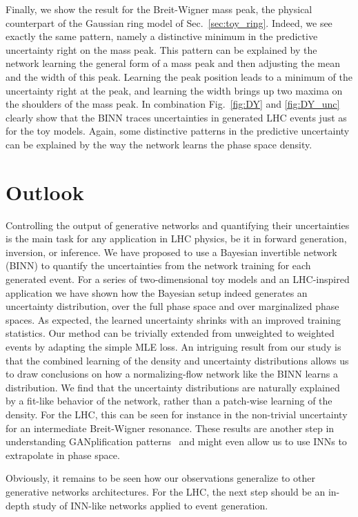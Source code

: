 Finally, we show the result for the Breit-Wigner mass peak, the
physical counterpart of the Gaussian ring model of
Sec.~\ref{sec:toy_ring}. Indeed, we see exactly the same pattern,
namely a distinctive minimum in the predictive uncertainty right on
the mass peak.  This pattern can be explained by the network learning
the general form of a mass peak and then adjusting the mean and the
width of this peak. Learning the peak position leads to a minimum of
the uncertainty right at the peak, and learning the width brings up
two maxima on the shoulders of the mass peak.  In combination
Fig.~\ref{fig:DY} and \ref{fig:DY_unc} clearly show that the BINN
traces uncertainties in generated LHC events just as for the toy
models. Again, some distinctive patterns in the predictive uncertainty
can be explained by the way the network learns the phase space
density.

\section{Outlook}

Controlling the output of generative networks and quantifying their
uncertainties is the main task for any application in LHC physics, be
it in forward generation, inversion, or inference.  We have proposed
to use a Bayesian invertible network (BINN) to quantify the
uncertainties from the network training for each generated event. For
a series of two-dimensional toy models and an LHC-inspired
application we have shown how the Bayesian setup indeed generates an
uncertainty distribution, over the full phase space and over marginalized phase
spaces. As expected, the learned uncertainty shrinks with an improved training
statistics. Our method can be trivially extended
from unweighted to weighted events by adapting the simple MLE loss.
An intriguing result from our study is that the combined learning of
the density and uncertainty distributions allows us to draw conclusions on
how a normalizing-flow network like the BINN learns a distribution. We
find that the uncertainty distributions are naturally explained by a
fit-like behavior of the network, rather than a patch-wise learning of
the density. For the LHC, this can be seen for instance in the
non-trivial uncertainty for an intermediate Breit-Wigner
resonance. These results are another step in understanding
GANplification patterns~\cite{Butter:2020qhk} and might even allow us
to use INNs to extrapolate in phase space.

Obviously, it remains to be seen how our observations generalize to
other generative networks architectures. For the LHC, the next step
should be an in-depth study of INN-like networks applied to event
generation.


%

